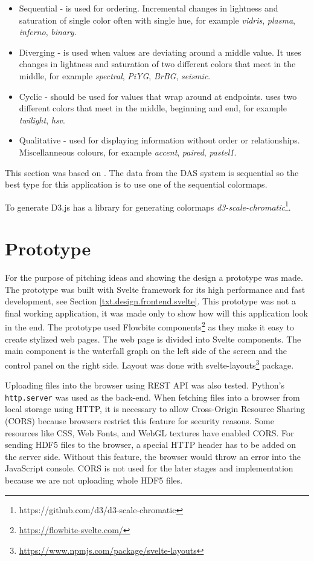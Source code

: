 \begin{itemize}
    \item Sequential - is used for ordering. Incremental changes in lightness and saturation of single color often with single hue, for example \textit{vidris}, \textit{plasma}, \textit{inferno}, \textit{binary}.
    \item Diverging - is used when values are deviating around a middle value. It uses changes in lightness and saturation of two different colors that meet in the middle, for example \textit{spectral}, \textit{PiYG}, \textit{BrBG}, \textit{seismic}.
    \item Cyclic - should be used for values that wrap around at endpoints. uses two different colors that meet in the middle, beginning and end, for example \textit{twilight}, \textit{hsv}.
    \item Qualitative - used for displaying information without order or relationships. Miscellanneous colours, for example \textit{accent}, \textit{paired}, \textit{pastel1}.
\end{itemize}

This section was based on \cite{colormap}. The data from the DAS system is sequential so the best type for this application is to use one of the sequential colormaps. 

To generate D3.js has a library for generating colormaps \textit{d3-scale-chromatic}\footnote{https://github.com/d3/d3-scale-chromatic}.


\section{Prototype}\label{txt.design.frontend.prototype}

For the purpose of pitching ideas and showing the design a prototype was made. The prototype was built with Svelte framework for its high performance and fast development, see Section \ref{txt.design.frontend.svelte}. This prototype was not a final working application, it was made only to show how will this application look in the end. The prototype used Flowbite components\footnote{\url{https://flowbite-svelte.com/}} as they make it easy to create stylized web pages. The web page is divided into Svelte components. The main component is the waterfall graph on the left side of the screen and the control panel on the right side. Layout was done with svelte-layouts\footnote{\url{https://www.npmjs.com/package/svelte-layouts}} package. 

Uploading files into the browser using REST API was also tested. Python's \verb|http.server| was used as the back-end. When fetching files into a browser from local storage using HTTP, it is necessary to allow Cross-Origin Resource Sharing (CORS) because browsers restrict this feature for security reasons. Some resources like CSS, Web Fonts, and WebGL textures have enabled CORS. For sending HDF5 files to the browser, a special HTTP header has to be added on the server side. Without this feature, the browser would throw an error into the JavaScript console. CORS is not used for the later stages and implementation because we are not uploading whole HDF5 files.

